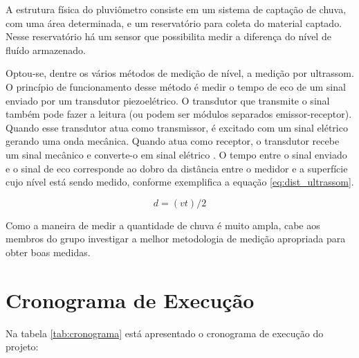 \documentclass[12pt,a4paper]{instrumentacao}
\begin{document}
A estrutura física do pluviômetro consiste em um sistema de captação de chuva, com uma área determinada, e um reservatório para coleta do material captado. Nesse reservatório há um sensor que possibilita medir a diferença do nível de fluído armazenado.

Optou-se, dentre os vários métodos de medição de nível, a medição por ultrassom. O princípio de funcionamento desse método é medir o tempo de eco de um sinal enviado por um transdutor piezoelétrico. O transdutor que transmite o sinal também pode fazer a leitura (ou podem ser módulos separados emissor-receptor). Quando esse transdutor atua como transmissor, é excitado com um sinal elétrico gerando uma onda mecânica. Quando atua como receptor, o transdutor recebe um sinal mecânico e converte-o em sinal elétrico \cite{livro-texto}. O tempo entre o sinal enviado e o sinal de eco corresponde ao dobro da distância entre o medidor e a superfície cujo nível está sendo medido, conforme exemplifica a equação \ref{eq:dist_ultrassom}.

\begin{equation}
	d=(vt)/2
	\label{eq:dist_ultrassom}
\end{equation}

Como a maneira de medir a quantidade de chuva é muito ampla, cabe aos membros do grupo investigar a melhor metodologia de medição apropriada para obter boas medidas.


\chapter{Cronograma de Execução}

Na tabela \ref{tab:cronograma} está apresentado o cronograma de execução do projeto:
\end{document}
